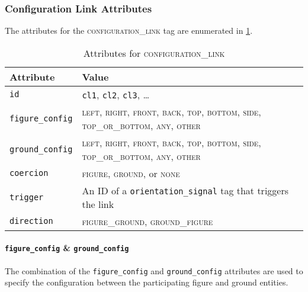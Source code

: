 \documentclass[11pt]{article}
\newenvironment{attributes}
{
\begin{tabular}{|l|l|}
    \hline \textbf{Attribute} & \textbf{Value}\\
}
{   \hline
\end{tabular}
}
\begin{document}


\subsubsection{Configuration Link Attributes} %
\label{ssub:configuration_link_attributes}

The attributes for the \textsc{configuration\_link} tag are enumerated in \cref{tab:configuration_link}. 

\begin{table}[h]
\centering
\begin{attributes}
    \hline \texttt{id}                  & \texttt{cl1}, \texttt{cl2}, 
                                          \texttt{cl3}, \ldots\\
    \hline \texttt{figure\_config}      & \textsc{left}, \textsc{right}, \textsc{front}, \textsc{back}, \textsc{top}, \textsc{bottom}, \textsc{side}, \textsc{top\_or\_bottom}, \textsc{any}, \textsc{other}\\
    \hline \texttt{ground\_config}      & \textsc{left}, \textsc{right}, \textsc{front}, \textsc{back}, \textsc{top}, \textsc{bottom}, \textsc{side}, \textsc{top\_or\_bottom}, \textsc{any}, \textsc{other}\\
    \hline \texttt{coercion}            & \textsc{figure}, \textsc{ground}, or \textsc{none}\\
    \hline \texttt{trigger}             & An ID of a \texttt{orientation\_signal} tag that triggers the link\\
    \hline \texttt{direction}           & \textsc{figure\_ground}, \textsc{ground\_figure}\\
\end{attributes}
\caption{Attributes for \textsc{configuration\_link}}
\label{tab:configuration_link}
\end{table}


\paragraph{\texttt{figure\_config} \& \texttt{ground\_config}} %
\label{par:figure_ground_config}
The combination of the \texttt{figure\_config} and \texttt{ground\_config} attributes are used to specify the configuration between the participating figure and ground entities. 
\end{document}
